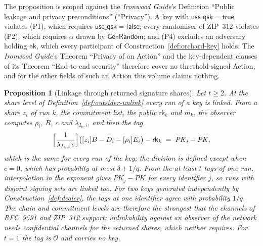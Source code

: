 \documentclass[11pt,a4paper]{article}
\newtheorem{proposition}[theorem]{Proposition}
\theoremstyle{definition}
\newcommand{\rk}{\mathsf{rk}}
\newcommand{\nksym}{\ensuremath{\mathsf{nk}}}
\begin{document}
The proposition is scoped against the \emph{Ironwood Guide}'s Definition
``Public leakage and privacy preconditions'' (``Privacy''). A key with
\(\mathsf{use\_qsk} = \mathsf{true}\) violates (P1), which requires
\(\mathsf{use\_qsk} = \mathsf{false}\); every randomiser of ZIP~312 violates
(P2), which requires \(\alpha\) drawn by \(\mathsf{GenRandom}\); and (P4)
excludes an adversary holding \(\nksym\), which every participant of
Construction~\ref{def:orchard-key} holds. The \emph{Ironwood Guide}'s
Theorem ``Privacy of an Action'' and the key-dependent clauses of its
Theorem ``End-to-end security'' therefore cover no threshold-signed Action,
and for the other fields of such an Action this volume claims nothing.

\begin{proposition}[Linkage through returned signature shares]
\label{prop:share-link}
Let \(t \ge 2\). At the share level of Definition~\ref{def:outsider-unlink}
every run of a key is linked. From a share \(z_i\) of run \(k\), the
commitment list, the public \(\rk_k\) and \(m_k\), the observer computes
\(\rho_i\), \(R\), \(c\) and \(\lambda_{I_k,i}\), and then the \emph{tag}
\[
  \Bigl[\frac{1}{\lambda_{I_k,i}\, c}\Bigr]
    \bigl([z_i]B - D_i - [\rho_i]E_i\bigr) - \rk_k
  \;=\; \mathit{PK}_i - \mathit{PK} ,
\]
which is the same for every run of the key; the division is defined except
when \(c = 0\), which has probability at most \(\delta + 1/q\). From the at
least \(t\) tags of one run, interpolation in the exponent gives
\(\mathit{PK}_j - \mathit{PK}\) for every identifier \(j\), so runs with
disjoint signing sets are linked too. For two keys generated independently
by Construction~\ref{def:dealer}, the tags at one identifier agree with
probability \(1/q\). The chain and commitment levels are therefore the
strongest that the channels of RFC~9591 and ZIP~312 support: unlinkability
against an observer of the network needs confidential channels for the
returned shares, which neither requires. For \(t = 1\) the tag is
\(\mathcal{O}\) and carries no key.
\end{proposition}
\end{document}
